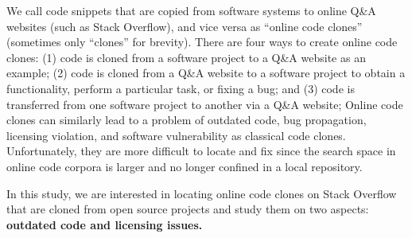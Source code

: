 \documentclass[sigconf,review, anonymous]{acmart}
\newcommand\FIXME[1]{\textbf{FIXME: #1}}
\begin{document}

We call code snippets that are copied from software systems to online Q\&A websites (such as Stack Overflow), and vice versa as ``online code clones'' (sometimes only ``clones'' for brevity). There are four ways to create online code clones: (1) code is cloned from a software project to a Q\&A website as an example; (2) code is cloned from a Q\&A website to a software project to obtain a functionality, perform a particular task, or fixing a bug; and (3) code is transferred from one software project to another via a Q\&A website; Online code clones can similarly lead to a problem of outdated code, bug propagation, licensing violation, and software vulnerability as classical code clones. Unfortunately, they are more difficult to locate and fix since the search space in online code corpora is larger and no longer confined in a local repository. 

In this study, we are interested in locating online code clones on Stack Overflow that are cloned from open source projects and study them on two aspects: \textbf{outdated code and licensing issues.}
\end{document}
